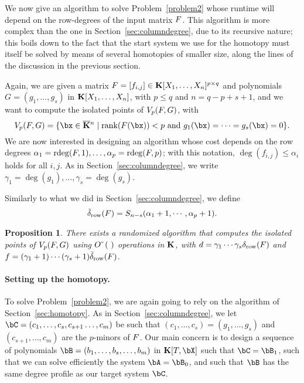 \documentclass[12pt]{article}
\newtheorem{proposition}[definition]{Proposition}
\begin{document}
We now give an algorithm to solve Problem~\ref{problem2} whose runtime
will depend on the row-degrees of the input matrix ${F}$. This
algorithm is more complex than the one in 
Section~\ref{sec:columndegree}, due to its recursive nature; this
boils down to the fact that the start system we use for the homotopy
must itself be solved by means of several homotopies of smaller size,
along the lines of the discussion in the previous section.

Again, we are given a matrix ${F} =[f_{i,j}]\in \mathbf{K}[X_1,\dots,X_n]^{p
  \times q}$ and polynomials $G=(g_1,\dots,g_s)$ in
$\mathbf{K}[X_1,\dots,X_n]$, with $p \leq q$ and $n = q-p+s+1$, and we want to
compute the isolated points of $V_{p}({F},G)$, with
$$\VpFG{p}{\mF}{G} = \{\bx \in \KKbar{}^n \mid \mathrm{rank}(\mF({\bx})) < p
\text{~and~} g_1(\bx)=\cdots=g_s(\bx)=0\}.$$ We are now interested in
designing an algorithm whose cost depends on the row degrees
$\alpha_1=\mathrm{rdeg}({F},1),\dots,\alpha_p=\mathrm{rdeg}({F},p)$; with this
notation, $\deg(f_{i,j}) \leq \alpha_i$ holds for all $i,j$. As in 
Section~\ref{sec:columndegree}, we write
$\gamma_1=\deg(g_1),\dots,\gamma_s=\deg(g_s)$.

Similarly to what we did in Section~\ref{sec:columndegree}, we define
\[
\tilde\delta_{\rm row}({F})=S_{n-s}(\alpha_1 +1,\cdots,\alpha_p+1).
\]

\begin{proposition}\label{prop:rowdegree}
  There exists a randomized algorithm that computes the isolated
  points of $V_{p}({F},G)$ using ${O}{\,\tilde{ }\,}\left (\ \right)$ operations in
  $\mathbf{K}$, with $d=\gamma_1\cdots\gamma_s \delta_{\rm row}({F})$ and
  $f=(\gamma_1+1)\cdots(\gamma_s+1) \tilde\delta_{\rm row}({F})$.
\end{proposition}



\paragraph{Setting up the homotopy.}
To solve Problem~\ref{problem2}, we are again going to rely on the
algorithm of Section~\ref{sec:homotopy}. As in Section~\ref{sec:columndegree},
we let $\bC=(c_1,\dots,c_s,c_{s+1}\dots,c_m)$ be such that
$(c_1,\dots,c_s)=(g_1,\dots,g_s)$ and $(c_{s+1},\dots,c_m)$ are the
$p$-minors of ${F}$. Our main concern is to design a sequence of
polynomials $\bB=(b_1,\dots,b_s,\dots,b_m)$ in $\KK[T,\bX]$ such that
$\bC=\bB_1$, such that we can solve efficiently the system
$\bA=\bB_0$, and such that $\bB$ has the same degree profile as our target system
$\bC$.
\end{document}
